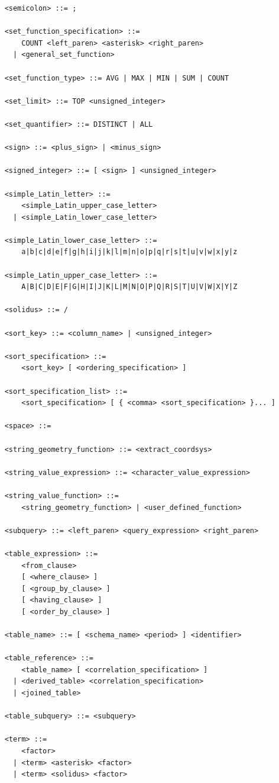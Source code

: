 \documentclass[11pt,a4paper]{ivoa}
\begin{document}
\begin{verbatim}
    <semicolon> ::= ;

    <set_function_specification> ::=
        COUNT <left_paren> <asterisk> <right_paren>
      | <general_set_function>

    <set_function_type> ::= AVG | MAX | MIN | SUM | COUNT

    <set_limit> ::= TOP <unsigned_integer>

    <set_quantifier> ::= DISTINCT | ALL

    <sign> ::= <plus_sign> | <minus_sign>

    <signed_integer> ::= [ <sign> ] <unsigned_integer>

    <simple_Latin_letter> ::=
        <simple_Latin_upper_case_letter>
      | <simple_Latin_lower_case_letter>

    <simple_Latin_lower_case_letter> ::=
        a|b|c|d|e|f|g|h|i|j|k|l|m|n|o|p|q|r|s|t|u|v|w|x|y|z

    <simple_Latin_upper_case_letter> ::=
        A|B|C|D|E|F|G|H|I|J|K|L|M|N|O|P|Q|R|S|T|U|V|W|X|Y|Z

    <solidus> ::= /

    <sort_key> ::= <column_name> | <unsigned_integer>

    <sort_specification> ::=
        <sort_key> [ <ordering_specification> ]

    <sort_specification_list> ::=
        <sort_specification> [ { <comma> <sort_specification> }... ]

    <space> ::=

    <string_geometry_function> ::= <extract_coordsys>

    <string_value_expression> ::= <character_value_expression>

    <string_value_function> ::=
        <string_geometry_function> | <user_defined_function>

    <subquery> ::= <left_paren> <query_expression> <right_paren>

    <table_expression> ::=
        <from_clause>
        [ <where_clause> ]
        [ <group_by_clause> ]
        [ <having_clause> ]
        [ <order_by_clause> ]

    <table_name> ::= [ <schema_name> <period> ] <identifier>

    <table_reference> ::=
        <table_name> [ <correlation_specification> ]
      | <derived_table> <correlation_specification>
      | <joined_table>

    <table_subquery> ::= <subquery>

    <term> ::=
        <factor>
      | <term> <asterisk> <factor>
      | <term> <solidus> <factor>


\end{verbatim}
\end{document}
